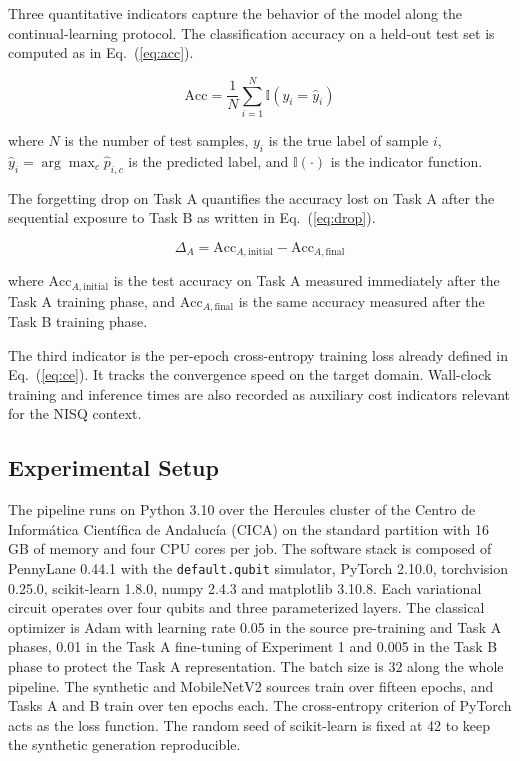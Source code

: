 \documentclass[runningheads]{llncs}
\begin{document}
Three quantitative indicators capture the behavior of the model along the continual-learning protocol. The classification accuracy on a held-out test set is computed as in Eq.~(\ref{eq:acc}).

\begin{equation}
\mathrm{Acc} = \frac{1}{N}\sum_{i=1}^{N} \mathbb{I}(y_i = \hat{y}_i)
\label{eq:acc}
\end{equation}

where $N$ is the number of test samples, $y_i$ is the true label of sample $i$, $\hat{y}_i = \arg\max_{c}\hat{p}_{i,c}$ is the predicted label, and $\mathbb{I}(\cdot)$ is the indicator function.

The forgetting drop on Task A quantifies the accuracy lost on Task A after the sequential exposure to Task B as written in Eq.~(\ref{eq:drop}).

\begin{equation}
\Delta_A = \mathrm{Acc}_{A,\text{initial}} - \mathrm{Acc}_{A,\text{final}}
\label{eq:drop}
\end{equation}

where $\mathrm{Acc}_{A,\text{initial}}$ is the test accuracy on Task A measured immediately after the Task A training phase, and $\mathrm{Acc}_{A,\text{final}}$ is the same accuracy measured after the Task B training phase.

The third indicator is the per-epoch cross-entropy training loss already defined in Eq.~(\ref{eq:ce}). It tracks the convergence speed on the target domain. Wall-clock training and inference times are also recorded as auxiliary cost indicators relevant for the NISQ context.

\subsection{Experimental Setup}

The pipeline runs on Python 3.10 over the Hercules cluster of the Centro de Inform\'atica Cient\'ifica de Andaluc\'ia (CICA) on the standard partition with 16 GB of memory and four CPU cores per job. The software stack is composed of PennyLane 0.44.1 with the \texttt{default.qubit} simulator, PyTorch 2.10.0, torchvision 0.25.0, scikit-learn 1.8.0, numpy 2.4.3 and matplotlib 3.10.8. Each variational circuit operates over four qubits and three parameterized layers. The classical optimizer is Adam with learning rate 0.05 in the source pre-training and Task A phases, 0.01 in the Task A fine-tuning of Experiment 1 and 0.005 in the Task B phase to protect the Task A representation. The batch size is 32 along the whole pipeline. The synthetic and MobileNetV2 sources train over fifteen epochs, and Tasks A and B train over ten epochs each. The cross-entropy criterion of PyTorch acts as the loss function. The random seed of scikit-learn is fixed at 42 to keep the synthetic generation reproducible.
\end{document}
